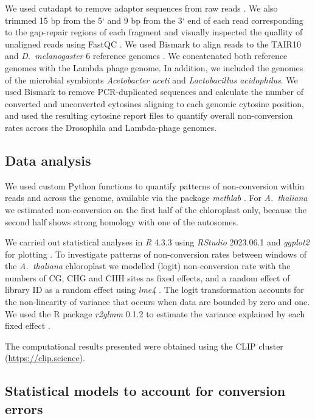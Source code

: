 \documentclass[10pt,draft,letterpaper]{article}
\begin{document}
We used cutadapt to remove adaptor sequences from raw reads \cite{martin2011cutadapt}.
We also trimmed 15 bp from the 5` and 9 bp from the 3` end of each read corresponding to the gap-repair regions of each fragment and visually inspected the quallity of unaligned reads using FastQC \cite{andrews2020fastqc}.
We used Bismark to align reads to the TAIR10 and \textit{D.~melanogaster} 6 reference genomes \cite{krueger2011bismark}.
We concatenated both reference genomes with the Lambda phage genome.
In addition, we included the genomes of the microbial symbionts \textit{Acetobacter aceti} and \textit{Lactobacillus acidophilus}.
We used Bismark to remove PCR-duplicated sequences and calculate the number of converted and unconverted cytosines aligning to each genomic cytosine position, and used the resulting cytosine report files to quantify overall non-conversion rates across the Drosophila and Lambda-phage genomes.

\subsection*{Data analysis}

We used custom Python functions to quantify patterns of non-conversion within reads and across the genome, available via the package \textit{methlab} \cite{ellis2023methlab}. For \emph{A.~thaliana} we estimated non-conversion on the first half of the chloroplast only, because the second half shows strong homology with one of the autosomes.

We carried out statistical analyses in \textit{R} 4.3.3 using \textit{RStudio} 2023.06.1 \cite{rlanguage, rstudio} and \textit{ggplot2} for plotting \cite{wickham2011ggplot2}. To investigate patterns of non-conversion rates between windows of the \textit{A.~thaliana} chloroplast we modelled (logit) non-conversion rate with the numbers of CG, CHG and CHH sites as fixed effects, and a random effect of library ID as a random effect using \textit{lme4} \cite{bates2015}. The logit transformation accounts for the non-linearity of variance that occurs when data are bounded by zero and one. We used the R package \textit{r2glmm} 0.1.2 to estimate the variance explained by each fixed effect \cite{r2glmm}.

The computational results presented were obtained using the CLIP cluster (\url{https://clip.science}).

\subsection*{Statistical models to account for conversion errors}
\end{document}
